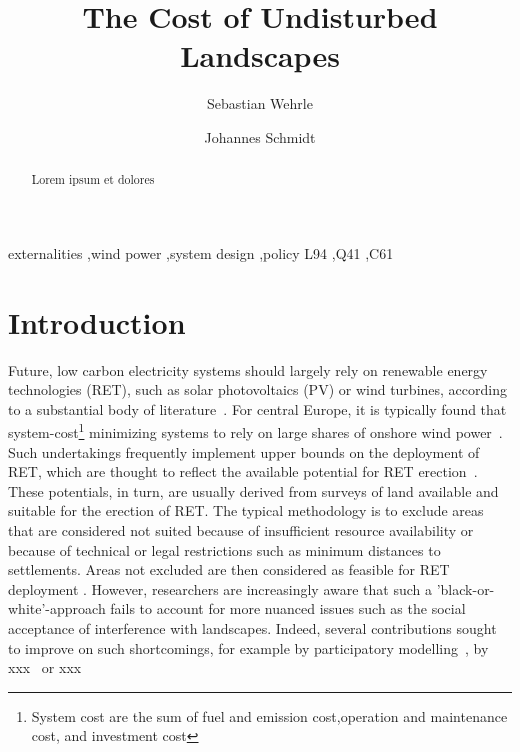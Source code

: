 \documentclass[final, 3p, times]{elsarticle} %
\begin{document}
    \begin{frontmatter}
        \title{The Cost of Undisturbed Landscapes}
        \author[1]{Sebastian Wehrle}
        \author[1]{Johannes Schmidt}
        \address[1]{Institute for Sustainable Economic Development, University of Natural Resources and Life Sciences,
        Feistmantelstrasse 4, 1180 Vienna, Austria}

        \begin{abstract}
            Lorem ipsum et dolores
        \end{abstract}

        \begin{keyword}
            externalities \sep wind power \sep system design \sep policy
            \JEL L94 \sep Q41 \sep C61
        \end{keyword}
    \end{frontmatter}
    \newpage



    \section{Introduction} \label{sec:introduction}
    Future, low carbon electricity systems should largely rely on renewable energy technologies (RET), such as solar
    photovoltaics (PV) or wind turbines, according to a substantial body of literature~\citep{Rodriguez2015}.
    For central Europe, it is typically found that system-cost\footnote{System cost are the sum of fuel and emission
    cost,operation and maintenance cost, and investment cost} minimizing systems to rely on large shares of onshore
    wind power~\citep{Rodriguez2015}.
    Such undertakings frequently implement upper bounds on the deployment of RET, which are thought to reflect the
    available potential for RET erection~\citep{references}.
    These potentials, in turn, are usually derived from surveys of land available and suitable for the erection of RET\@.
    The typical methodology is to exclude areas that are considered not suited because of insufficient resource
    availability or because of technical or legal restrictions such as minimum distances to settlements.
    Areas not excluded are then considered as feasible for RET deployment \citep[e.g.][]{McKenna2015, Bosch2017, Ryberg2020}.
    However, researchers are increasingly aware that such a 'black-or-white'-approach fails to account for more nuanced
    issues such as the social acceptance of interference with landscapes.
    Indeed, several contributions sought to improve on such shortcomings, for example by participatory
    modelling~\citep{Hoeltinger2016}, by xxx~\citep{Jaeger2016} or xxx~\citep{Harper2019}
\end{document}
